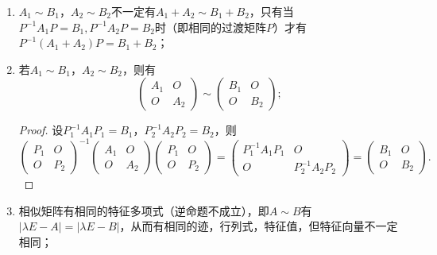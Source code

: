 \begin{enumerate}
\begin{proof}
\begin{enumerate}
                  \item 由于$B^{-1}=(C^{-1}AC)^{-1}=C^{-1}A^{-1}C$，因此$A^{-1}\sim B^{-1}$，$A^*\sim B^*$.

                  \item 由于$B^*=(C^{-1}AC)^*=C^{-1}A^*C$，因此$A^*\sim B^*$.
              \end{enumerate}
          \end{proof}

    \item $A_1\sim B_1$，$A_2\sim B_2$不一定有$A_1+A_2\sim B_1+B_2$，只有当$P^{-1}A_1P=B_1,P^{-1}A_2P=B_2$时（即相同的过渡矩阵$P$）才有$P^{-1}(A_1+A_2)P=B_1+B_2$；

    \item 若$A_1\sim B_1$，$A_2\sim B_2$，则有
          \[ \begin{pmatrix}
                  A_1 & O \\ O & A_2
              \end{pmatrix}\sim\begin{pmatrix}
                  B_1 & O \\ O & B_2
              \end{pmatrix};\]

          \begin{proof}
              设$P_1^{-1}A_1P_1=B_1$，$P_2^{-1}A_2P_2=B_2$，则
              \[ \begin{pmatrix}
                      P_1 & O \\ O & P_2
                  \end{pmatrix}^{-1}\begin{pmatrix}
                      A_1 & O \\ O & A_2
                  \end{pmatrix}\begin{pmatrix}
                      P_1 & O \\ O & P_2
                  \end{pmatrix}=\begin{pmatrix}
                      P_1^{-1}A_1P_1 & O \\ O & P_2^{-1}A_2P_2
                  \end{pmatrix}=\begin{pmatrix}
                      B_1 & O \\ O & B_2
                  \end{pmatrix}.\]
          \end{proof}

    \item 相似矩阵有相同的特征多项式（逆命题不成立），即$A\sim B$有$|\lambda E-A|=|\lambda E-B|$，从而有相同的迹，行列式，特征值，但特征向量不一定相同；


\end{enumerate}
